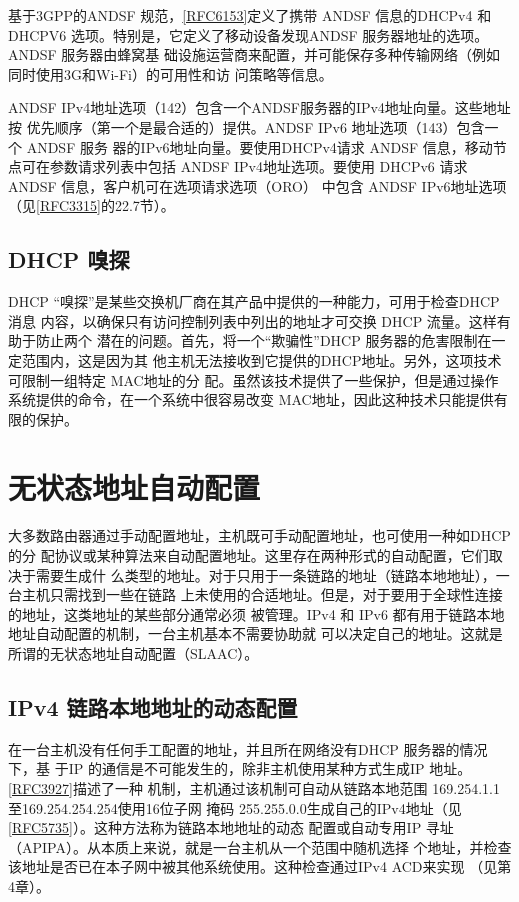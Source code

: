 基于3GPP的ANDSF
规范，\href{https://www.rfc-editor.org/rfc/rfc6153}{\href{https://www.rfc-editor.org/rfc/rfc6153}{[RFC6153]}}定义了携带
ANDSF 信息的DHCPv4 和 DHCPV6
选项。特别是，它定义了移动设备发现ANDSF 服务器地址的选项。ANDSF 服务器由蜂窝基
础设施运营商来配置，并可能保存多种传输网络（例如同时使用3G和Wi-Fi）的可用性和访
问策略等信息。

ANDSF IPv4地址选项（142）包含一个ANDSF服务器的IPv4地址向量。这些地址按
优先顺序（第一个是最合适的）提供。ANDSF IPv6 地址选项（143）包含一个 ANDSF 服务
器的IPv6地址向量。要使用DHCPv4请求 ANDSF 信息，移动节点可在参数请求列表中包括
ANDSF IPv4地址选项。要使用 DHCPv6 请求 ANDSF 信息，客户机可在选项请求选项（ORO）
中包含 ANDSF
IPv6地址选项（见\href{https://www.rfc-editor.org/rfc/rfc3315}{\href{https://www.rfc-editor.org/rfc/rfc3315}{[RFC3315]}}的22.7节）。

\subsection{DHCP 嗅探}
DHCP “嗅探”是某些交换机厂商在其产品中提供的一种能力，可用于检查DHCP 消息
内容，以确保只有访问控制列表中列出的地址才可交换 DHCP 流量。这样有助于防止两个
潜在的问题。首先，将一个“欺骗性”DHCP 服务器的危害限制在一定范围内，这是因为其
他主机无法接收到它提供的DHCP地址。另外，这项技术可限制一组特定 MAC地址的分
配。虽然该技术提供了一些保护，但是通过操作系统提供的命令，在一个系统中很容易改变
MAC地址，因此这种技术只能提供有限的保护。

\section{无状态地址自动配置}
大多数路由器通过手动配置地址，主机既可手动配置地址，也可使用一种如DHCP的分
配协议或某种算法来自动配置地址。这里存在两种形式的自动配置，它们取决于需要生成什
么类型的地址。对于只用于一条链路的地址（链路本地地址），一台主机只需找到一些在链路
上未使用的合适地址。但是，对于要用于全球性连接的地址，这类地址的某些部分通常必须
被管理。IPv4 和 IPv6 都有用于链路本地地址自动配置的机制，一台主机基本不需要协助就
可以决定自己的地址。这就是所谓的无状态地址自动配置（SLAAC）。

\subsection{IPv4 链路本地地址的动态配置}
在一台主机没有任何手工配置的地址，并且所在网络没有DHCP 服务器的情况下，基
于IP 的通信是不可能发生的，除非主机使用某种方式生成IP
地址。\href{https://www.rfc-editor.org/rfc/rfc3927}{\href{https://www.rfc-editor.org/rfc/rfc3927}{[RFC3927]}}描述了一种
机制，主机通过该机制可自动从链路本地范围 169.254.1.1 至169.254.254.254使用16位子网
掩码
255.255.0.0生成自己的IPv4地址（见\href{https://www.rfc-editor.org/rfc/rfc5735}{\href{https://www.rfc-editor.org/rfc/rfc5735}{[RFC5735]}}）。这种方法称为链路本地地址的动态
配置或自动专用IP 寻址（APIPA）。从本质上来说，就是一台主机从一个范围中随机选择
个地址，并检查该地址是否已在本子网中被其他系统使用。这种检查通过IPv4 ACD来实现
（见第4章）。

